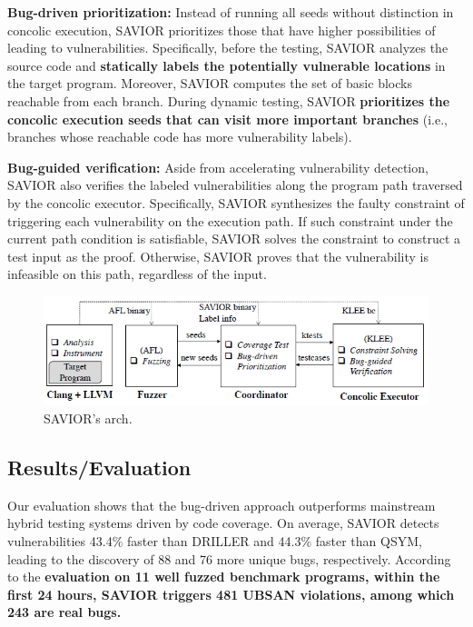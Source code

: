 \documentclass[]{article} %
\begin{document}
\textbf{Bug-driven prioritization:} Instead of running all seeds without
distinction in concolic execution, SAVIOR prioritizes
those that have higher possibilities of leading to vulnerabilities.
Specifically, before the testing, SAVIOR analyzes the source
code and \textbf{statically labels the potentially vulnerable locations}
in the target program.
Moreover, SAVIOR computes the set of basic blocks reachable
from each branch. During dynamic testing, SAVIOR \textbf{prioritizes the concolic execution seeds that can visit more
important branches} (i.e., branches whose reachable code has
more vulnerability labels).

\textbf{Bug-guided verification: }Aside from accelerating vulnerability
detection, SAVIOR also verifies the labeled vulnerabilities
along the program path traversed by the concolic executor.
Specifically, SAVIOR synthesizes the faulty constraint of
triggering each vulnerability on the execution path. If such
constraint under the current path condition is satisfiable,
SAVIOR solves the constraint to construct a test input as
the proof. Otherwise, SAVIOR proves that the vulnerability
is infeasible on this path, regardless of the input.

\begin{figure}[t]
    \centering
    \includegraphics[scale=0.9]{savior.png} %
    \caption{SAVIOR's arch.}	
    \label{fig:savior}
\end{figure}

\subsection{Results/Evaluation %
}
Our evaluation shows that the bug-driven approach outperforms mainstream
 hybrid testing systems driven by code coverage. On average, SAVIOR
detects vulnerabilities 43.4\% faster than DRILLER and 44.3\%
faster than QSYM, leading to the discovery of 88 and 76 more
unique bugs, respectively. According to the \textbf{evaluation on 11 well
fuzzed benchmark programs, within the first 24 hours, SAVIOR
triggers 481 UBSAN violations, among which 243 are real bugs.}
\end{document}
